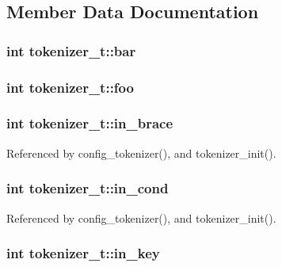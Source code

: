 \subsection{Member Data Documentation}
\hypertarget{structtokenizer__t_aab3fb25eca721fdf164d49e59179877b}{
\subsubsection[{bar}]{\setlength{\rightskip}{0pt plus 5cm}int tokenizer\-\_\-t\-::bar}}\label{structtokenizer__t_aab3fb25eca721fdf164d49e59179877b}
\hypertarget{structtokenizer__t_aeb671697b102a7abdc5de793647b295d}{
\subsubsection[{foo}]{\setlength{\rightskip}{0pt plus 5cm}int tokenizer\-\_\-t\-::foo}}\label{structtokenizer__t_aeb671697b102a7abdc5de793647b295d}
\hypertarget{structtokenizer__t_a47a2885a35a004215bd4b8ca033ec1f1}{
\subsubsection[{in\-\_\-brace}]{\setlength{\rightskip}{0pt plus 5cm}int tokenizer\-\_\-t\-::in\-\_\-brace}}\label{structtokenizer__t_a47a2885a35a004215bd4b8ca033ec1f1}


Referenced by config\-\_\-tokenizer(), and tokenizer\-\_\-init().

\hypertarget{structtokenizer__t_a3a26f2f38a7d20c5610caaab36d104c5}{
\subsubsection[{in\-\_\-cond}]{\setlength{\rightskip}{0pt plus 5cm}int tokenizer\-\_\-t\-::in\-\_\-cond}}\label{structtokenizer__t_a3a26f2f38a7d20c5610caaab36d104c5}


Referenced by config\-\_\-tokenizer(), and tokenizer\-\_\-init().

\hypertarget{structtokenizer__t_ae9a9d1f8d2299346d77f6a0dfba61c29}{
\subsubsection[{in\-\_\-key}]{\setlength{\rightskip}{0pt plus 5cm}int tokenizer\-\_\-t\-::in\-\_\-key}}\label{structtokenizer__t_ae9a9d1f8d2299346d77f6a0dfba61c29}


